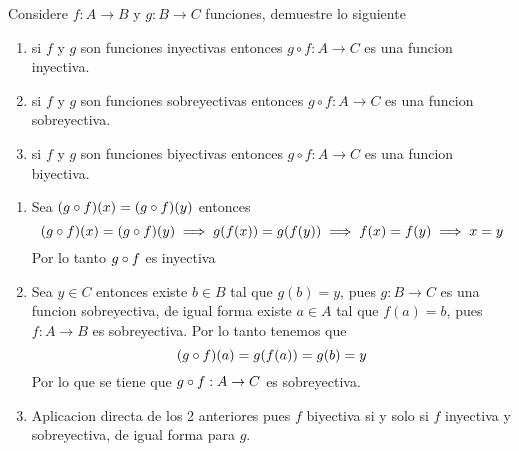 \documentclass[../main.tex]{subfiles}
\begin{document}
\begin{problem}
  Considere $f: A \to B$ y $g: B \to C$ funciones, demuestre lo siguiente
  \begin{enumerate}
          \item si $f$ y $g$ son funciones inyectivas entonces $g \circ f: A \to C$ es una funcion inyectiva.
          \item si $f$ y $g$ son funciones sobreyectivas entonces $g \circ f: A \to C$ es una funcion sobreyectiva.
          \item si $f$ y $g$ son funciones biyectivas entonces $g \circ f: A \to C$ es una funcion biyectiva.
  \end{enumerate}
\end{problem}
\begin{solution}
  \begin{enumerate}
    \item Sea $(g \circ f)(x) = (g \circ f)(y)$ entonces
          \begin{equation*}
            (g \circ f)(x) = (g \circ f)(y) \implies g(f(x)) = g(f(y)) \implies f(x) = f(y) \implies x = y
          \end{equation*}
  Por lo tanto $g \circ f$ es inyectiva

    \item Sea $y \in C$ entonces existe $b \in B$ tal que $g(b) = y$, pues $g: B \to C$ es una funcion sobreyectiva, de igual forma existe $a \in A$ tal que $f(a) = b$, pues $f: A \to B$ es sobreyectiva. Por lo tanto tenemos que
          \begin{equation*}
            (g \circ f)(a) = g(f(a)) = g(b) = y
          \end{equation*}
    Por lo que se tiene que $g \circ f : A \to C$ es sobreyectiva.

    \item Aplicacion directa de los 2 anteriores pues $f$ biyectiva si y solo si $f$ inyectiva y sobreyectiva, de igual forma para $g$.
  \end{enumerate}
\end{solution}
\end{document}
